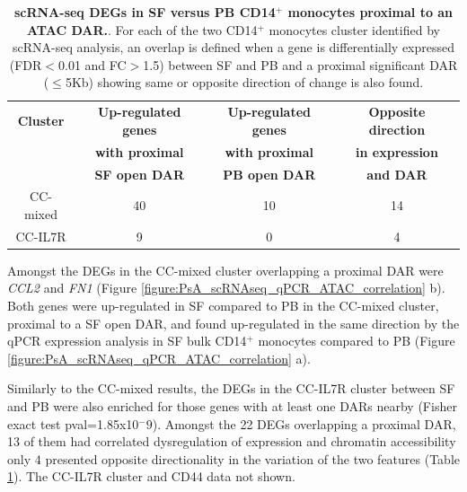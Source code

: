   
\begin{table}[htbp]
\centering
\begin{tabular}{@{} c c c c}
\toprule
\textbf{Cluster} & \textbf{Up-regulated genes}        &  \textbf{Up-regulated genes }  & \textbf{Opposite direction} \\
                   & \textbf{with proximal}           &  \textbf{with proximal}      & \textbf{in expression } \\
									 &	\textbf{SF open DAR}				    &  \textbf{PB open DAR}        & \textbf{and DAR}\\
\midrule
\midrule
 CC-mixed         & 40                                       &  10                                & 14 \\
 CC-IL7R          & 9                                        &  0                                 & 4 \\
\bottomrule
\end{tabular}
\medskip %
\caption[scRNA-seq DEGs in SF versus PB CD14$^+$ monocytes proximal to a DAR in Fast-ATAC.]{\textbf{scRNA-seq DEGs in SF versus PB CD14$^+$ monocytes proximal to an ATAC DAR.}. For each of the two CD14$^+$ monocytes cluster identified by scRNA-seq analysis, an overlap is defined when a gene is differentially expressed (FDR$<$0.01 and FC$>$1.5) between SF and PB and a proximal significant DAR ($\leq$5Kb) showing same or opposite direction of change is also found.}
\label{tab:PSA_10X_CD14_clusters_and_ATAC_overlap}
\end{table}

Amongst the DEGs in the CC-mixed cluster overlapping a proximal DAR were \textit{CCL2} and \textit{FN1} (Figure \ref{figure:PsA_scRNAseq_qPCR_ATAC_correlation} b). Both genes were up-regulated in SF compared to PB in the CC-mixed cluster, proximal to a SF open DAR, and found up-regulated in the same direction by the qPCR expression analysis in SF bulk CD14$^+$ monocytes compared to PB (Figure \ref{figure:PsA_scRNAseq_qPCR_ATAC_correlation} a). 

Similarly to the CC-mixed results, the DEGs in the CC-IL7R cluster between SF and PB were also enriched for those genes with at least one DARs nearby (Fisher exact test pval=1.85x10$^-9$). Amongst the 22 DEGs overlapping a proximal DAR, 13 of them had correlated dysregulation of expression and chromatin accessibility only 4 presented opposite directionality in the variation of the two features (Table \ref{tab:PSA_10X_CD14_clusters_and_ATAC_overlap}). The CC-IL7R cluster and CD44 data not shown.


